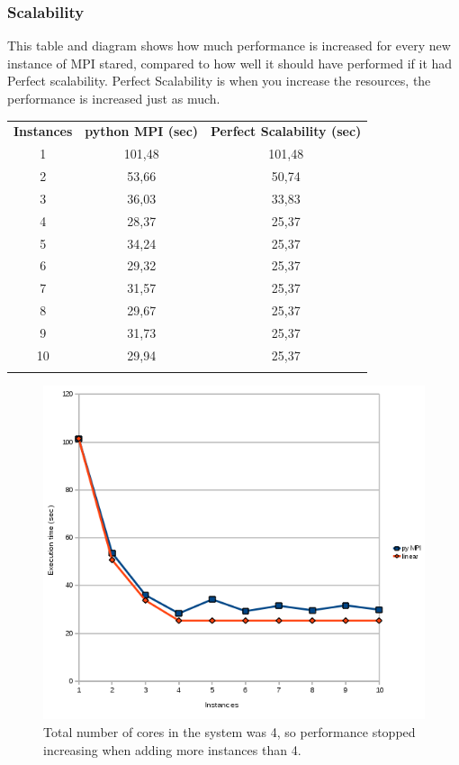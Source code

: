 \documentclass{article}
\begin{document}
\subsubsection{Scalability}
This table and diagram shows how much performance is increased for every
new instance of MPI stared, compared to how well it should have performed
if it had Perfect scalability\cite{jogalekar2000evaluating}. Perfect
Scalability is when you increase the resources, the performance is increased
just as much. 
\begin{table}[H]
\begin{tabular}{c c c}
  \rowcolor[gray]{0.5}
  {\bf Instances} & {\bf python MPI (sec)} & {\bf Perfect Scalability (sec)} \\
  1 & 101,48 & 101,48 \\
  2 & 53,66  & 50,74  \\
  3 & 36,03  & 33,83  \\
  4 & 28,37  & 25,37  \\
  5 & 34,24  & 25,37  \\
  6 & 29,32  & 25,37  \\
  7 & 31,57  & 25,37  \\
  8 & 29,67  & 25,37  \\
  9 & 31,73  & 25,37  \\
 10 & 29,94  & 25,37  \\
\rowcolor[gray]{0.5}
\end{tabular}
\end{table}
\begin{figure}[H]
\center

\includegraphics[width=\textwidth]{img/scalabilty-pympi.png}
\caption{Total number of cores in the system was 4, so performance stopped
increasing when adding more instances than 4. }
\end{figure}
\end{document}
